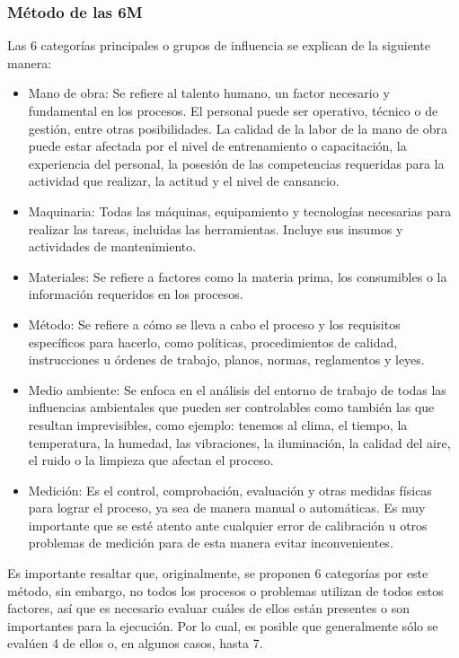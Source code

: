 \documentclass[../main]{subfiles}
\begin{document}
\subsubsection{Método de las 6M}
Las 6 categorías principales o grupos de influencia se explican de la
siguiente manera:
\begin{itemize}
  \item Mano de obra: Se refiere al talento humano, un factor
    necesario y fundamental en los procesos. El personal puede ser
    operativo, técnico o de gestión, entre otras posibilidades. La
    calidad de la labor de la mano de obra puede estar afectada por
    el nivel de entrenamiento o capacitación, la experiencia del
    personal, la posesión de las competencias requeridas para la
    actividad que realizar, la actitud y el nivel de cansancio.

  \item Maquinaria: Todas las máquinas, equipamiento y tecnologías
    necesarias para realizar las tareas, incluidas las herramientas.
    Incluye sus insumos y actividades de mantenimiento.

  \item Materiales: Se refiere a factores como la materia prima, los
    consumibles o la información requeridos en los procesos.

  \item Método: Se refiere a cómo se lleva a cabo el proceso y los
    requisitos específicos para hacerlo, como políticas,
    procedimientos de calidad, instrucciones u órdenes de trabajo,
    planos, normas, reglamentos y leyes.

  \item Medio ambiente: Se enfoca en el análisis del entorno de
    trabajo de todas las influencias ambientales que pueden ser
    controlables como también las que resultan imprevisibles, como
    ejemplo: tenemos al clima, el tiempo, la temperatura, la humedad,
    las vibraciones, la iluminación, la calidad del aire, el ruido o
    la limpieza que afectan el proceso.

  \item Medición: Es el control, comprobación, evaluación y otras
    medidas físicas para lograr el proceso, ya sea de manera manual o
    automáticas. Es muy importante que se esté atento ante cualquier
    error de calibración u otros problemas de medición para de esta
    manera evitar inconvenientes.
\end{itemize}
Es importante resaltar que, originalmente, se proponen 6 categorías
por este método, sin embargo, no todos los procesos o problemas
utilizan de todos estos factores, así que es necesario evaluar cuáles
de ellos están presentes o son importantes para la ejecución. Por lo
cual, es posible que generalmente sólo se evalúen 4 de ellos o, en
algunos casos, hasta 7.
\end{document}
